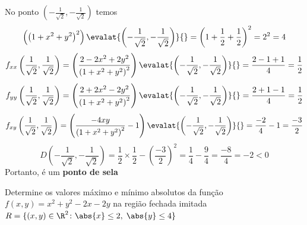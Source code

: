 \documentclass[a4paper,12pt,fleqn]{article}
\begin{document}
\begin{answer}
  \bigskip
  No ponto \(\left( -\frac{1}{\sqrt{2}}, -\frac{1}{\sqrt{2}}\right)\)
  temos
  \[
    \left(\left(1+x^2+y^2\right)^2\right)\evalat{\left(-\frac{1}{\sqrt{2}}, -\frac{1}{\sqrt{2}}\right)}{}
    = \left(1+\frac{1}{2}+\frac{1}{2}\right)^2
    = 2^2
    = 4
  \]
  \[
  f_{xx}\left( \frac{1}{\sqrt{2}},  \frac{1}{\sqrt{2}}\right)
  = \left(\frac{2-2x^2+2y^2}{\left(1+x^2+y^2\right)^2}\right)\evalat{\left(-\frac{1}{\sqrt{2}}, -\frac{1}{\sqrt{2}}\right)}{}
  = \frac{2-1+1}{4}
  = \frac{1}{2}
  \]
  \[
  f_{yy}\left( \frac{1}{\sqrt{2}},  \frac{1}{\sqrt{2}}\right)
  = \left(\frac{2+2x^2-2y^2}{\left(1+x^2+y^2\right)^2}\right)\evalat{\left(-\frac{1}{\sqrt{2}}, -\frac{1}{\sqrt{2}}\right)}{}
  = \frac{2+1-1}{4}
  = \frac{1}{2}
  \]
  \[
  f_{xy}\left( \frac{1}{\sqrt{2}},  \frac{1}{\sqrt{2}}\right)
  = \left(\frac{-4xy}{\left(1+x^2+y^2\right)^2} -1\right)\evalat{\left(-\frac{1}{\sqrt{2}}, -\frac{1}{\sqrt{2}}\right)}{}
  = \frac{-2}{4} -1
  = \frac{-3}{2}
  \]
  \[
  D\left(-\frac{1}{\sqrt{2}}, -\frac{1}{\sqrt{2}}\right)
  = \frac{1}{2}\times\frac{1}{2} - \left(\frac{-3}{2}\right)^2
  = \frac{1}{4} - \frac{9}{4}
  = \frac{-8}{4}
  = -2
  < 0
  \]
  Portanto, é um \textbf{ponto de sela}
\end{answer}

Determine os valores máximo e mínimo absolutos da função
\(
  f(x, y) = x^2 + y^2 - 2x - 2y
\)
na região fechada imitada
\(
  R = \{(x, y)\in\R^2\colon \abs{x}\le 2 ,\; \abs{y}\le 4 \}
\)

\clearpagequestiononly
\end{document}
